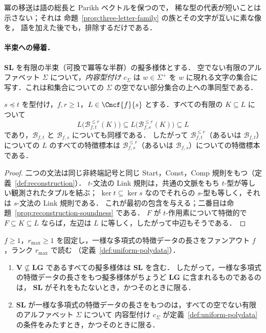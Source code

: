 \begin{remark}
冪の移送は語の総長と Parikh ベクトルを保つので，
稀な型の代表が短いことは示さない；それは
命題~\ref{prop:three-letter-family} の族とその文字が互いに素な像を，
語を加えた後でも，排除するだけである．
\end{remark}

\paragraph{半束への帰着．}
$\mathbf{SL}$ を有限の半束（可換で冪等な半群）の擬多様体とする．
空でない有限のアルファベット $\Sigma$ について，\emph{内容型付け} $c_\Sigma$ は
$w\in\Sigma^+$ を $w$ に現れる文字の集合に写す．これは和集合についての $\Sigma$ の空でない部分集合の上への準同型である．

\begin{lemma}[粗い型付けは特徴標本を受け継ぐ]
\label{lem:typing-monotone}
$s\preceq t$ を型付け，$f,r\ge1$，$L\in\Cmcf{f}{s}$ とする．すべての有限の $K\subseteq L$ について
\[
 L\bigl(\mathcal B^{\le r}_{f,t}(K)\bigr)\subseteq
 L\bigl(\mathcal B^{\le r}_{f,s}(K)\bigr)\subseteq L
\]
であり，$\mathcal B_{f,t}$ と $\mathcal B_{f,s}$ についても同様である．
したがって $\mathcal B^{\le r}_{f,t}$（あるいは $\mathcal B_{f,t}$）についての $L$ のすべての特徴標本は
$\mathcal B^{\le r}_{f,s}$（あるいは $\mathcal B_{f,s}$）についての特徴標本である．
\end{lemma}

\begin{proof}
二つの文法は同じ非終端記号と同じ Start，Const，Comp 規則をもつ（定義~\ref{def:reconstruction}）．
$t$-文法の Link 規則は，共通の文脈をもち $t$-型が等しい観測されたタプルを結ぶ；
$\ker t\subseteq\ker s$ なのでそれらの $s$-型も等しく，それは $s$-文法の Link 規則である．
これが最初の包含を与える；二番目は命題~\ref{prop:reconstruction-soundness} である．
$F$ が $t$-作用素について特徴的で $F\subseteq K\subseteq L$ ならば，左辺は $L$ に等しく，したがって中辺もそうである．
\end{proof}

\begin{proposition}[ファンアウトの境界の半束への帰着]
\label{prop:sl-reduction}
$f\ge1$，$r_{\max}\ge1$ を固定し，一様な多項式の特徴データの長さをファンアウト $f$，ランク $r_{\max}$ で読む
（定義~\ref{def:uniform-polydata}）．
\begin{enumerate}[label=\textup{(\roman*)},leftmargin=*]
\item $\mathbf V\not\subseteq\mathbf{LG}$ であるすべての擬多様体は $\mathbf{SL}$ を含む．
したがって，一様な多項式の特徴データの長さをもつ擬多様体がちょうど $\mathbf{LG}$ に含まれるものであるのは，
$\mathbf{SL}$ がそれをもたないとき，かつそのときに限る．
\item $\mathbf{SL}$ が一様な多項式の特徴データの長さをもつのは，すべての空でない有限のアルファベット $\Sigma$ について
内容型付け $c_\Sigma$ が定義~\ref{def:uniform-polydata} の条件をみたすとき，かつそのときに限る．
\end{enumerate}
\end{proposition}


